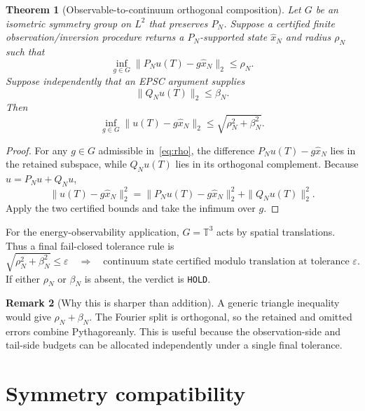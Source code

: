 \documentclass[11pt]{article}
\newtheorem{theorem}{Theorem}
\theoremstyle{definition}
\newtheorem{remark}[theorem]{Remark}
\newcommand{\Torus}{\mathbb T^3}
\newcommand{\eps}{\varepsilon}
\begin{document}
\begin{theorem}[Observable-to-continuum orthogonal composition]\label{thm:compose}
Let $G$ be an isometric symmetry group on $L^2$ that preserves $P_N$.  Suppose a certified finite
observation/inversion procedure returns a $P_N$-supported state $\widehat x_N$ and radius $\rho_N$
such that
\begin{equation}\label{eq:rho}
\inf_{g\in G}\|P_Nu(T)-g\widehat x_N\|_2\le\rho_N.
\end{equation}
Suppose independently that an EPSC argument supplies
\begin{equation}\label{eq:betaN}
\|Q_Nu(T)\|_2\le\beta_N.
\end{equation}
Then
\begin{equation}\label{eq:compose}
\boxed{
\inf_{g\in G}\|u(T)-g\widehat x_N\|_2
\le
\sqrt{\rho_N^2+\beta_N^2}.
}
\end{equation}
\end{theorem}

\begin{proof}
For any $g\in G$ admissible in~\eqref{eq:rho}, the difference
$P_Nu(T)-g\widehat x_N$ lies in the retained subspace, while $Q_Nu(T)$ lies in its orthogonal
complement.  Because $u=P_Nu+Q_Nu$,
\[
\|u(T)-g\widehat x_N\|_2^2
=
\|P_Nu(T)-g\widehat x_N\|_2^2+\|Q_Nu(T)\|_2^2.
\]
Apply the two certified bounds and take the infimum over $g$.
\end{proof}

For the energy-observability application, $G=\Torus$ acts by spatial translations.  Thus a final
fail-closed tolerance rule is
\begin{equation}\label{eq:finalgate}
\boxed{
\sqrt{\rho_N^2+\beta_N^2}\le\eps
\quad\Longrightarrow\quad
\text{continuum state certified modulo translation at tolerance }\eps.
}
\end{equation}
If either $\rho_N$ or $\beta_N$ is absent, the verdict is \texttt{HOLD}.

\begin{remark}[Why this is sharper than addition]
A generic triangle inequality would give $\rho_N+\beta_N$.  The Fourier split is orthogonal, so the
retained and omitted errors combine Pythagoreanly.  This is useful because the observation-side and
tail-side budgets can be allocated independently under a single final tolerance.
\end{remark}

\section{Symmetry compatibility}
\end{document}
